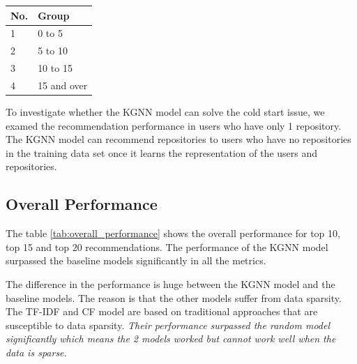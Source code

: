 \documentclass[11pt,twoside]{report}
\begin{document}
\begin{center}
    \begin{tabular}{l | l}
    \hline
    No. & Group \\
    \hline
    1 & 0 to 5 \\
    2 & 5 to 10 \\
    3 & 10 to 15 \\
    4 & 15 and over
    \end{tabular}
    \label{tab:4_groups}
\end{center}

To investigate whether the KGNN model can solve the cold start issue, we examed the recommendation performance in users who have only 1 repository. The KGNN model can recommend repositories to users who have no repositories in the training data set once it learns the representation of the users and repositories.

\subsection{Overall Performance}
The table \ref{tab:overall_performance} shows the overall performance for top 10, top 15 and top 20 recommendations. The performance of the KGNN model surpassed the baseline models significantly in all the metrics.

The difference in the performance is huge between the KGNN model and the baseline models. The reason is that the other models suffer from data sparsity. The TF-IDF and CF model are based on traditional approaches that are susceptible to data sparsity. \textit{Their performance surpassed the random model significantly which means the 2 models worked but cannot work well when the data is sparse.}
\end{document}
